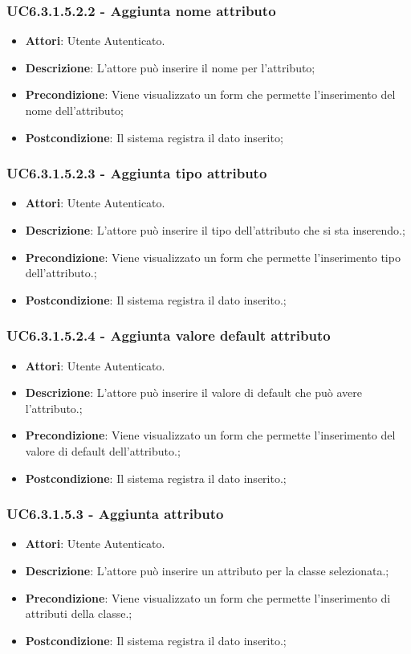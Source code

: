 \subsubsection{UC6.3.1.5.2.2 - Aggiunta nome attributo} 
\label{sssec:UC6.3.1.5.2.2} 
\begin{itemize} 
\item \textbf{Attori}: Utente Autenticato.
\item \textbf{Descrizione}: L'attore può inserire il nome per l'attributo;
\item \textbf{Precondizione}: Viene visualizzato un form che permette l'inserimento del nome dell'attributo;
\item \textbf{Postcondizione}: Il sistema registra il dato inserito;
\end{itemize} 
\subsubsection{UC6.3.1.5.2.3 - Aggiunta tipo attributo} 
\label{sssec:UC6.3.1.5.2.3} 
\begin{itemize} 
\item \textbf{Attori}: Utente Autenticato.
\item \textbf{Descrizione}: L'attore può inserire il tipo dell'attributo che si sta inserendo.;
\item \textbf{Precondizione}: Viene visualizzato un form che permette l'inserimento tipo dell'attributo.;
\item \textbf{Postcondizione}: Il sistema registra il dato inserito.;
\end{itemize} 
\subsubsection{UC6.3.1.5.2.4 - Aggiunta valore default attributo} 
\label{sssec:UC6.3.1.5.2.4} 
\begin{itemize} 
\item \textbf{Attori}: Utente Autenticato.
\item \textbf{Descrizione}: L'attore può inserire il valore di default che può avere l'attributo.;
\item \textbf{Precondizione}: Viene visualizzato un form che permette l'inserimento del valore di default dell'attributo.;
\item \textbf{Postcondizione}: Il sistema registra il dato inserito.;
\end{itemize} 
\subsubsection{UC6.3.1.5.3 - Aggiunta attributo} 
\label{sssec:UC6.3.1.5.3} 
\begin{itemize} 
\item \textbf{Attori}: Utente Autenticato.
\item \textbf{Descrizione}: L'attore può inserire un attributo per la classe selezionata.;
\item \textbf{Precondizione}: Viene visualizzato un form che permette l'inserimento di attributi della classe.;
\item \textbf{Postcondizione}: Il sistema registra il dato inserito.;
\end{itemize} 

